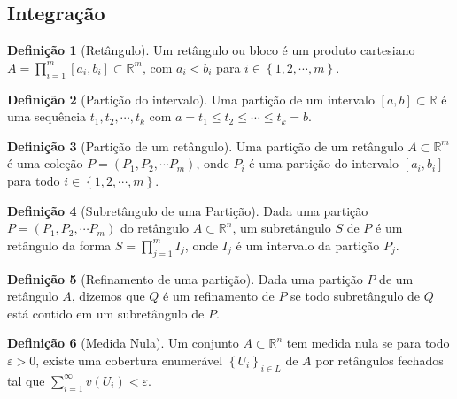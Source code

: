 \documentclass{article}
\theoremstyle{plain}
\theoremstyle{definition}
\newtheorem{definicao}{Definição}[section]
\theoremstyle{remark}
\begin{document}
\subsection{Integração}
\begin{definicao}[Retângulo]
	Um retângulo ou bloco é um produto cartesiano $A = \displaystyle\prod_{i = 1}^m [a_i,b_i] \subset \mathbb{R}^m$, com $a_i < b_i$ para $i\in \left\{1,2, \cdots ,m \right\}$.
\end{definicao}
\begin{definicao}[Partição do intervalo]
	Uma partição de um intervalo $[a,b] \subset \mathbb{R}$ é uma sequência  $t_1,t_2,\cdots, t_k$ com $a = t_1 \leq t_2 \leq \cdots \leq t_k = b$.
\end{definicao}
\begin{definicao}[Partição de um retângulo]
	Uma partição de um retângulo $A \subset \mathbb{R}^m$ é uma coleção $P = (P_1,P_2,\cdots P_m)$, onde $P_i$ é uma partição do  intervalo $[a_i,b_i]$ para todo $i\in \left\{1,2, \cdots ,m \right\}$.
\end{definicao}

\begin{definicao}[Subretângulo de uma Partição]
	Dada uma partição $P = (P_1, P_2, \cdots P_m)$ do retângulo $A\subset \mathbb{R}^n$, um subretângulo $S$ de $P$ é um retângulo da forma $S = \displaystyle\prod_{j = 1}^m I_j$, onde $I_j$ é um intervalo da partição $P_j$.
\end{definicao}
\begin{definicao}[Refinamento de uma partição]
	Dada uma partição $P$ de um retângulo $A$, dizemos que $Q$ é um refinamento de $P$ se todo subretângulo de $Q$ está contido em um subretângulo de $P$.
\end{definicao}
\begin{definicao}[Medida Nula]
	Um conjunto $A\subset \mathbb{R}^n$ tem medida nula se para todo $\varepsilon>0$,  existe uma cobertura enumerável    $\left\{ U_i \right\}_{i\in L}$ de $A$ por retângulos fechados tal que $\displaystyle\sum_{i = 1}^{\infty} v\left(U_i\right) < \varepsilon$.
\end{definicao}
\end{document}
